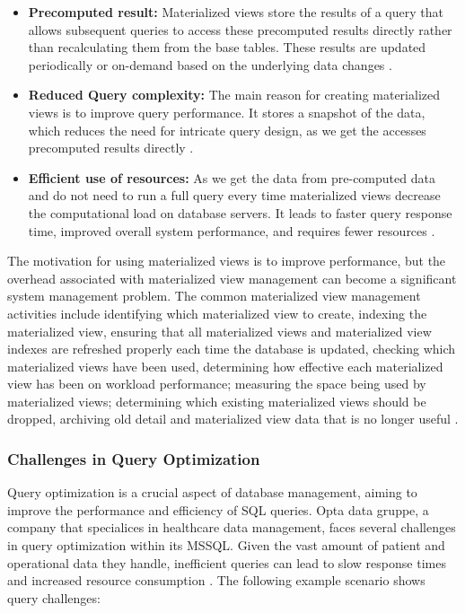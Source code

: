 \begin{itemize}
    \item\textbf{Precomputed result:} Materialized views store the results of a query that allows subsequent queries to access these precomputed results directly rather than recalculating them from the base tables. These results are updated periodically or on-demand based on the underlying data changes \cite{khan-2023,Risingwave-no-date}.
    \item\textbf{Reduced Query complexity:} The main reason for creating materialized views is to improve query performance. It stores a snapshot of the data, which reduces the need for intricate query design, as we get the accesses precomputed results directly \cite{Risingwave-no-date,Databricks-no-date}.
    \item\textbf{Efficient use of resources:} As we get the data from pre-computed data and do not need to run a full query every time materialized views decrease the computational load on database servers. It leads to faster query response time, improved overall system performance, and requires fewer resources \cite{google-no-date, khan-2023}.
    
\end{itemize}\vspace{.4cm}

The motivation for using materialized views is to improve performance, but the overhead associated with materialized view management can become a significant system management problem. The common materialized view management activities include identifying which materialized view to create, indexing the materialized view, ensuring that all materialized views and materialized view indexes are refreshed properly each time the database is updated, checking which materialized views have been used, determining how effective each materialized view has been on workload performance; measuring the space being used by materialized views; determining which existing materialized views should be dropped,  archiving old detail and materialized view data that is no longer useful \cite{Ashadevi2008CostEA,1363763}.

\subsubsection{Challenges in Query Optimization} Query optimization is a crucial aspect of database management, aiming to improve the performance and efficiency of SQL queries. Opta data gruppe, a company that specialices in healthcare data management, faces several challenges in query optimization within its MSSQL. Given the vast amount of patient and operational data they handle, inefficient queries can lead to slow response times and increased resource consumption \cite{Flipico-2024}. The following example scenario shows query challenges:\vspace{.4cm}


